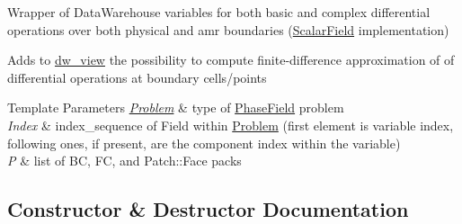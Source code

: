 Wrapper of Data\+Warehouse variables for both basic and complex differential operations over both physical and amr boundaries (\hyperlink{structUintah_1_1PhaseField_1_1ScalarField}{Scalar\+Field} implementation) 

Adds to \hyperlink{classUintah_1_1PhaseField_1_1detail_1_1dw__view}{dw\+\_\+view} the possibility to compute finite-\/difference approximation of of differential operations at boundary cells/points


\begin{DoxyTemplParams}{Template Parameters}
{\em \hyperlink{classUintah_1_1PhaseField_1_1Problem}{Problem}} & type of \hyperlink{namespaceUintah_1_1PhaseField}{Phase\+Field} problem \\
\hline
{\em Index} & index\+\_\+sequence of Field within \hyperlink{classUintah_1_1PhaseField_1_1Problem}{Problem} (first element is variable index, following ones, if present, are the component index within the variable) \\
\hline
{\em P} & list of BC, FC, and Patch\+::\+Face packs \\
\hline
\end{DoxyTemplParams}


\subsection{Constructor \& Destructor Documentation}
\mbox{\label{classUintah_1_1PhaseField_1_1detail_1_1bcfd__view_3_01ScalarField_3_01T_01_4_00_01STN_00_01Problem_00_01Index_00_01P_8_8_8_01_4_abaa29ff6c02f48531b6119eb8e25c2ae}} 
